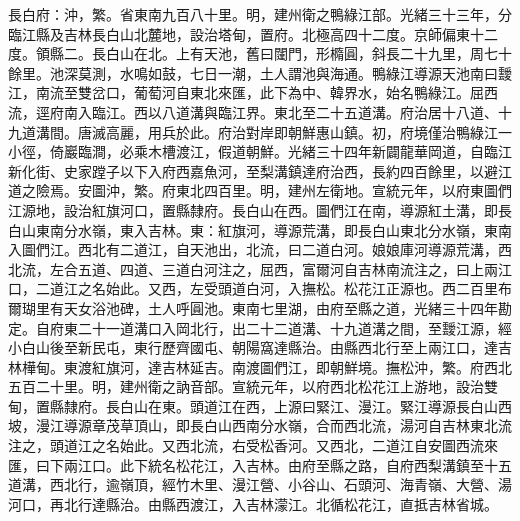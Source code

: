 \begin{pinyinscope}
長白府：沖，繁。省東南九百八十里。明，建州衛之鴨綠江部。光緒三十三年，分臨江縣及吉林長白山北麓地，設治塔甸，置府。北極高四十二度。京師偏東十二度。領縣二。長白山在北。上有天池，舊曰闥門，形橢圓，斜長二十九里，周七十餘里。池深莫測，水鳴如鼓，七日一潮，土人謂池與海通。鴨綠江導源天池南曰靉江，南流至雙岔口，葡萄河自東北來匯，此下為中、韓界水，始名鴨綠江。屈西流，逕府南入臨江。西以八道溝與臨江界。東北至二十五道溝。府治居十八道、十九道溝間。唐滅高麗，用兵於此。府治對岸即朝鮮惠山鎮。初，府境僅治鴨綠江一小徑，倚巖臨澗，必乘木槽渡江，假道朝鮮。光緒三十四年新闢龍華岡道，自臨江新化街、史家蹚子以下入府西嘉魚河，至梨溝鎮達府治西，長約四百餘里，以避江道之險焉。安圖沖，繁。府東北四百里。明，建州左衛地。宣統元年，以府東圖們江源地，設治紅旗河口，置縣隸府。長白山在西。圖們江在南，導源紅土溝，即長白山東南分水嶺，東入吉林。東：紅旗河，導源荒溝，即長白山東北分水嶺，東南入圖們江。西北有二道江，自天池出，北流，曰二道白河。娘娘庫河導源荒溝，西北流，左合五道、四道、三道白河注之，屈西，富爾河自吉林南流注之，曰上兩江口，二道江之名始此。又西，左受頭道白河，入撫松。松花江正源也。西二百里布爾瑚里有天女浴池碑，土人呼圓池。東南七里湖，由府至縣之道，光緒三十四年勘定。自府東二十一道溝口入岡北行，出二十二道溝、十九道溝之間，至靉江源，經小白山後至新民屯，東行歷齊國屯、朝陽窩達縣治。由縣西北行至上兩江口，達吉林樺甸。東渡紅旗河，達吉林延吉。南渡圖們江，即朝鮮境。撫松沖，繁。府西北五百二十里。明，建州衛之訥音部。宣統元年，以府西北松花江上游地，設治雙甸，置縣隸府。長白山在東。頭道江在西，上源曰緊江、漫江。緊江導源長白山西坡，漫江導源章茂草頂山，即長白山西南分水嶺，合而西北流，湯河自吉林東北流注之，頭道江之名始此。又西北流，右受松香河。又西北，二道江自安圖西流來匯，曰下兩江口。此下統名松花江，入吉林。由府至縣之路，自府西梨溝鎮至十五道溝，西北行，逾嶺頂，經竹木里、漫江營、小谷山、石頭河、海青嶺、大營、湯河口，再北行達縣治。由縣西渡江，入吉林濛江。北循松花江，直抵吉林省城。


\end{pinyinscope}
